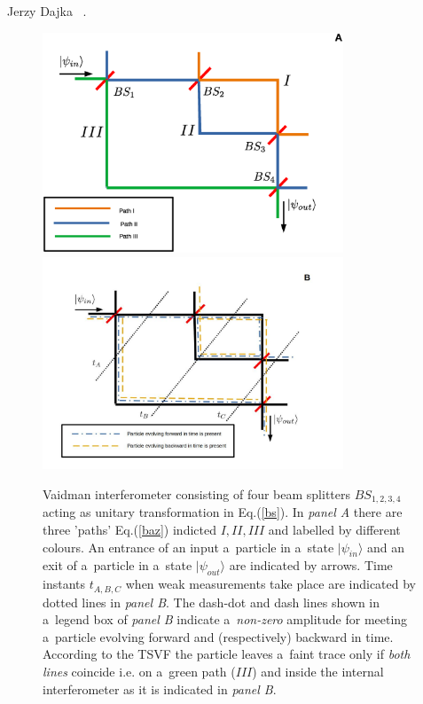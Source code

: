\begin{artengenv}{Jerzy Dajka}
~\parencite{PhysRevA.95.032110,PhysRevA.97.046102,PhysRevA.97.046103,vaid_trans,lady}. 
\begin{figure}
\begin{center}
 \includegraphics[width=0.8\textwidth]{ART_dajka/vaid1a.eps}\\%
 \includegraphics[width=0.8\textwidth]{ART_dajka/vaid1b.jpg}%
\end{center}
 \caption{Vaidman  interferometer consisting of four beam splitters $BS_{1,2,3,4}$ acting as unitary transformation in Eq.(\ref{bs}). In  {\it panel A} there are  three 'paths' Eq.(\ref{baz}) indicted  $I,II,III$ and labelled by different colours. An entrance of an input a~particle in a~state $|\psi_{in}\rangle$ and an exit of a~particle in a~state $|\psi_{out}\rangle$ are indicated by arrows. Time instants  $t_{A,B,C}$ when  weak measurements take place are indicated by dotted lines in  {\it panel B}. The dash-dot and dash lines shown in a~legend box of {\it panel B} indicate  a~{\it non-zero} amplitude for meeting a~particle evolving forward and (respectively) backward in time. According to the TSVF the particle leaves a~faint trace only if {\it both lines} coincide i.e. on a~green path ($III$) and inside the internal interferometer as it is indicated in {\it panel B}.}\label{fig0}
\end{figure}


\end{artengenv}
